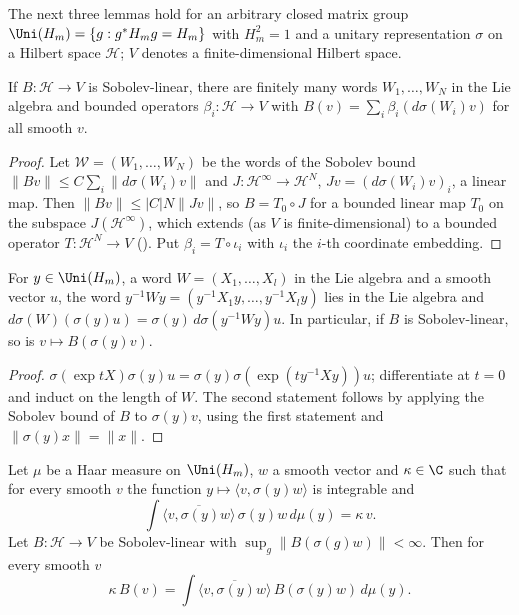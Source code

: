 The next three lemmas hold for an arbitrary closed matrix group $\Uni(H_m)=\{g:g^*H_mg=H_m\}$ with $H_m^2=1$ and a
unitary representation $\sigma$ on a Hilbert space $\mathcal H$; $V$ denotes a finite-dimensional Hilbert space.

\begin{lemma}[Factorisation]\label{pf:sh-local:factor}
If $B:\mathcal H\to V$ is Sobolev-linear, there are finitely many words $W_1,\dots,W_N$ in the Lie algebra and
bounded operators $\beta_i:\mathcal H\to V$ with $B(v)=\sum_i\beta_i(d\sigma(W_i)v)$ for all smooth $v$.
\end{lemma}

\begin{proof}
Let $\mathcal W=(W_1,\dots,W_N)$ be the words of the Sobolev bound $\|Bv\|\le C\sum_i\|d\sigma(W_i)v\|$ and
$J:\mathcal H^\infty\to\mathcal H^N$, $Jv=(d\sigma(W_i)v)_i$, a linear map. Then $\|Bv\|\le|C|N\|Jv\|$, so
$B=T_0\circ J$ for a bounded linear map $T_0$ on the subspace $J(\mathcal H^\infty)$, which extends (as $V$ is
finite-dimensional) to a bounded operator $T:\mathcal H^N\to V$
(). Put
$\beta_i=T\circ\iota_i$ with $\iota_i$ the $i$-th coordinate embedding.
\end{proof}

\begin{lemma}\label{pf:sh-local:dsad}
For $y\in\Uni(H_m)$, a word $W=(X_1,\dots,X_l)$ in the Lie algebra and a smooth vector $u$, the word
$y^{-1}Wy=(y^{-1}X_1y,\dots,y^{-1}X_ly)$ lies in the Lie algebra and
$d\sigma(W)(\sigma(y)u)=\sigma(y)\,d\sigma(y^{-1}Wy)u$. In particular, if $B$ is Sobolev-linear, so is
$v\mapsto B(\sigma(y)v)$.
\end{lemma}

\begin{proof}
$\sigma(\exp tX)\sigma(y)u=\sigma(y)\sigma(\exp(ty^{-1}Xy))u$; differentiate at $t=0$ and induct on the length of
$W$. The second statement follows by applying the Sobolev bound of $B$ to $\sigma(y)v$, using the first statement
and $\|\sigma(y)x\|=\|x\|$.
\end{proof}

\begin{lemma}\label{pf:sh-local:cutlim}
Let $\mu$ be a Haar measure on $\Uni(H_m)$, $w$ a smooth vector and $\kappa\in\C$ such that for every smooth $v$
the function $y\mapsto\langle v,\sigma(y)w\rangle$ is integrable and
\begin{equation}\label{eq:pf:sh-local:repro}
\int\overline{\langle v,\sigma(y)w\rangle}\,\sigma(y)w\,d\mu(y)=\kappa\,v .
\end{equation}
Let $B:\mathcal H\to V$ be Sobolev-linear with $\sup_g\|B(\sigma(g)w)\|<\infty$. Then for every smooth $v$
\[
\kappa\,B(v)=\int\overline{\langle v,\sigma(y)w\rangle}\,B(\sigma(y)w)\,d\mu(y).
\]
\end{lemma}

